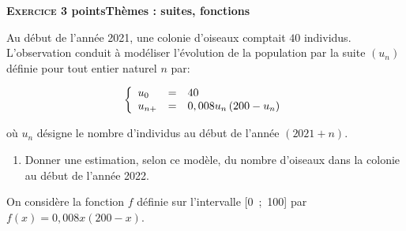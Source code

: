 \documentclass[10pt,a4paper]{article}
\begin{document}
\bigskip

\textbf{\textsc{Exercice 3}  points\hfill Thèmes : suites, fonctions}

\medskip

Au début de l'année 2021, une colonie d'oiseaux comptait $40$ individus. L'observation conduit à modéliser l'évolution de la population par la suite $\left(u_n\right)$ définie pour tout entier naturel $n$ par:

\[\left\{\begin{array}{l c l}
u_0&=&40\\u_{n+}&=&0,008u_n\left(200 - u_n\right)
\end{array}\right.\]

où $u_n$ désigne le nombre d'individus au début de l'année $(2021+n)$.

\medskip


\begin{enumerate}
\item Donner une estimation, selon ce modèle, du nombre d'oiseaux dans la colonie au
début de l'année 2022.
\end{enumerate}

On considère la fonction $f$ définie sur l'intervalle [0~;~100] par $f(x) = 0,008x(200 - x)$.
\end{document}
